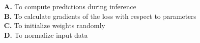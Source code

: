 \documentclass[11pt]{article}
\begin{document}
\begin{enumerate}[label=Q\arabic*., leftmargin=*]
\textbf{A.} To compute predictions during inference\\
\textbf{B.} To calculate gradients of the loss with respect to parameters\\
\textbf{C.} To initialize weights randomly\\
\textbf{D.} To normalize input data

\end{enumerate}
\end{document}
